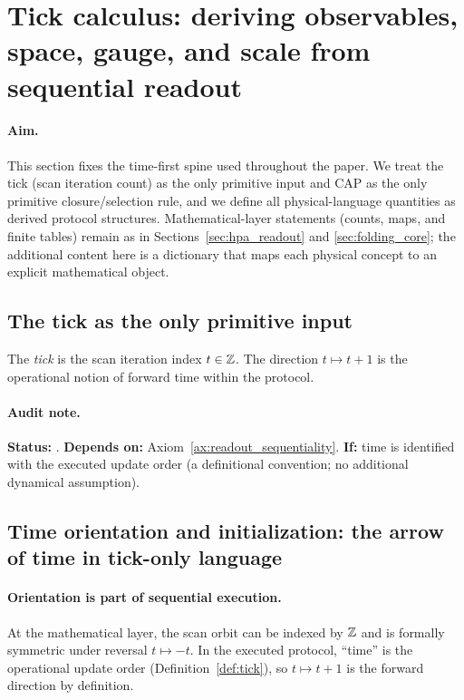 \section{Tick calculus: deriving observables, space, gauge, and scale from sequential readout}
\label{sec:tick_calculus}

\paragraph{Aim.}
This section fixes the time-first spine used throughout the paper.
We treat the tick (scan iteration count) as the only primitive input and CAP as the only primitive closure/selection rule, and we define all physical-language quantities as derived protocol structures.
Mathematical-layer statements (counts, maps, and finite tables) remain as in Sections~\ref{sec:hpa_readout} and \ref{sec:folding_core}; the additional content here is a dictionary that maps each physical concept to an explicit mathematical object.

\subsection{The tick as the only primitive input}
\label{subsec:tick_only_input}

\begin{definition}
\label{def:tick}
The \emph{tick} is the scan iteration index $t\in\mathbb{Z}$.
The direction $t\mapsto t+1$ is the operational notion of forward time within the protocol.
\end{definition}

\paragraph{Audit note.}
\AuditTag \textbf{Status:} \InterfaceTag.
\textbf{Depends on:} Axiom~\ref{ax:readout_sequentiality}.
\textbf{If:} time is identified with the executed update order (a definitional convention; no additional dynamical assumption).

\subsection{Time orientation and initialization: the arrow of time in tick-only language}
\label{subsec:tick_time_arrow}

\paragraph{Orientation is part of sequential execution.}
\InterfaceTag At the mathematical layer, the scan orbit can be indexed by $\mathbb{Z}$ and is formally symmetric under reversal $t\mapsto -t$.
In the executed protocol, ``time'' is the operational update order (Definition~\ref{def:tick}), so $t\mapsto t+1$ is the forward direction by definition.

